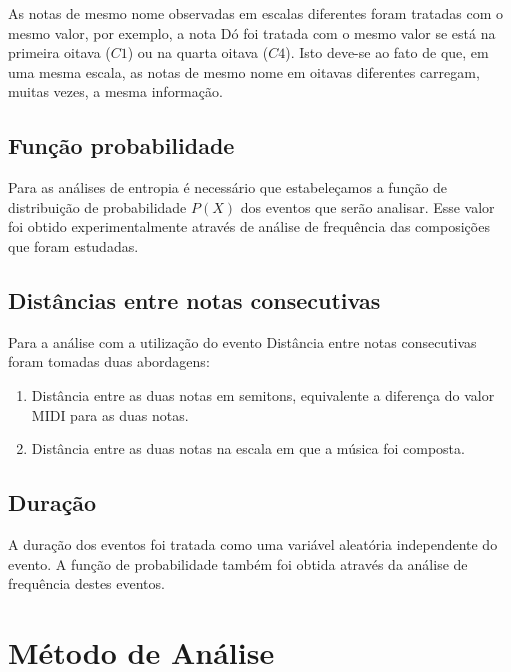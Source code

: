 As notas de mesmo nome observadas em escalas diferentes foram tratadas com o mesmo valor, por exemplo, a nota Dó foi tratada com o mesmo valor se está na primeira oitava ($C1$) ou na quarta oitava ($C4$). Isto deve-se ao fato de que, em uma mesma escala, as notas de mesmo nome em oitavas diferentes carregam, muitas vezes, a mesma informação.

\subsection{Função probabilidade}

Para as análises de entropia é necessário que estabeleçamos a função de distribuição de probabilidade $P(X)$ dos eventos que serão analisar. Esse valor foi obtido experimentalmente através de análise de frequência das composições que foram estudadas.

\subsection{Distâncias entre notas consecutivas}

Para a análise com a utilização do evento Distância entre notas consecutivas foram tomadas duas abordagens:

\begin{enumerate}
    \item Distância entre as duas notas em semitons, equivalente a diferença do valor MIDI para as duas notas.
    \item Distância entre as duas notas na escala em que a música foi composta.
\end{enumerate}

\subsection{Duração}

A duração dos eventos foi tratada como uma variável aleatória independente do evento. A função de probabilidade também foi obtida através da análise de frequência destes eventos.

\section{Método de Análise}


